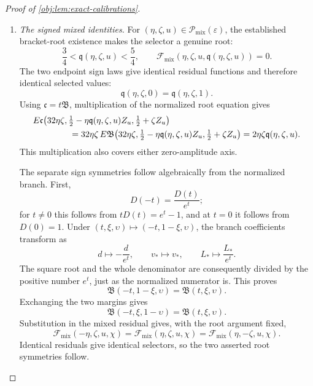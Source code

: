 \begin{proof}[Proof of \cref{obj:lem:exact-calibrations}]
\begin{enumerate}
\item \emph{The signed mixed identities.}
For \((\eta,\zeta,u)\in\mathcal P_{\mathrm{mix}}(\varepsilon)\), the established bracket-root existence makes the selector a genuine root:
\[
\frac34<\mathfrak q(\eta,\zeta,u)<\frac54,
\qquad
\mathcal F_{\mathrm{mix}}
(\eta,\zeta,u,\mathfrak q(\eta,\zeta,u))=0.
\]
The two endpoint sign laws give identical residual functions and therefore identical selected values:
\[
\mathfrak q(\eta,\zeta,0)=\mathfrak q(\eta,\zeta,1).
\]
Using \(\mathfrak c=t\mathfrak B\), multiplication of the normalized root equation gives
\[
\begin{aligned}
&E\mathfrak c
\bigl(32\eta\zeta,
\tfrac12-\eta\mathfrak q(\eta,\zeta,u)Z_u,
\tfrac12+\zeta Z_u\bigr)\\
&\hspace{15mm}
=32\eta\zeta\,E\mathfrak B
\bigl(32\eta\zeta,
\tfrac12-\eta\mathfrak q(\eta,\zeta,u)Z_u,
\tfrac12+\zeta Z_u\bigr)
=2\eta\zeta\mathfrak q(\eta,\zeta,u).
\end{aligned}
\]
This multiplication also covers either zero-amplitude axis.

The separate sign symmetries follow algebraically from the normalized branch. First,
\[
D(-t)=\frac{D(t)}{e^t};
\]
for \(t\ne0\) this follows from \(tD(t)=e^t-1\), and at \(t=0\) it follows from \(D(0)=1\). Under
\((t,\xi,\upsilon)\mapsto(-t,1-\xi,\upsilon)\), the branch coefficients transform as
\[
d\mapsto-\frac d{e^t},
\qquad
v_*\mapsto v_*,
\qquad
L_*\mapsto\frac{L_*}{e^t}.
\]
The square root and the whole denominator are consequently divided by the positive number \(e^t\), just as the normalized numerator is. This proves
\[
\mathfrak B(-t,1-\xi,\upsilon)
=\mathfrak B(t,\xi,\upsilon).
\]
Exchanging the two margins gives
\[
\mathfrak B(-t,\xi,1-\upsilon)
=\mathfrak B(t,\xi,\upsilon).
\]
Substitution in the mixed residual gives, with the root argument fixed,
\[
\mathcal F_{\mathrm{mix}}(-\eta,\zeta,u,\chi)
=\mathcal F_{\mathrm{mix}}(\eta,\zeta,u,\chi)
=\mathcal F_{\mathrm{mix}}(\eta,-\zeta,u,\chi).
\]
Identical residuals give identical selectors, so the two asserted root symmetries follow.


\end{enumerate}
\end{proof}
